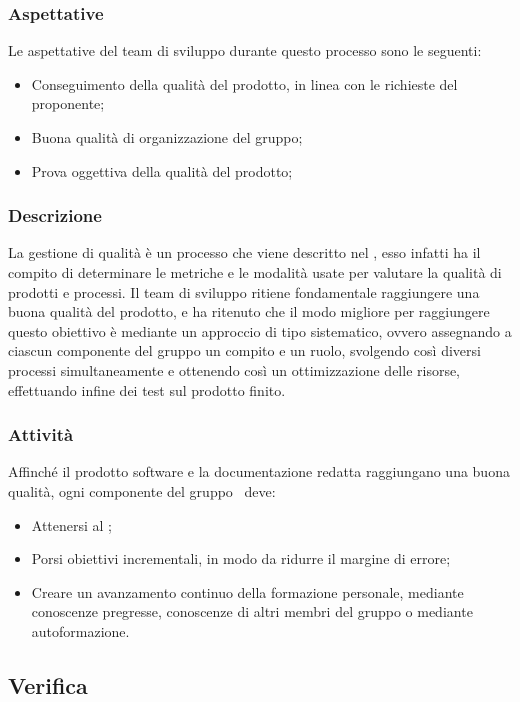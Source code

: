 \subsubsection{Aspettative}
Le aspettative del team di sviluppo durante questo processo sono le seguenti:
\begin {itemize}
    \item Conseguimento della qualità del prodotto, in linea con le richieste del proponente;
    \item Buona qualità di organizzazione del gruppo;
    \item Prova oggettiva della qualità del prodotto;
\end {itemize}
\subsubsection{Descrizione}
La gestione di qualità è un processo che viene descritto nel \docNamePdQLow, esso infatti ha il compito di determinare le metriche e le modalità usate per valutare la qualità di prodotti e processi.
Il team di sviluppo ritiene fondamentale raggiungere una buona qualità del prodotto, e ha ritenuto che il modo migliore per raggiungere questo obiettivo è mediante un approccio di tipo sistematico, ovvero assegnando a ciascun componente del gruppo un compito e un ruolo, svolgendo così diversi processi simultaneamente e ottenendo così un ottimizzazione delle risorse, effettuando infine dei test sul prodotto finito. 
\subsubsection{Attività}
Affinché il prodotto software e la documentazione redatta raggiungano una buona qualità, ogni componente del gruppo \groupName\ deve:
\begin{itemize}
    \item Attenersi al \docNamePdQLow;
    \item Porsi obiettivi incrementali, in modo da ridurre il margine di errore;
    \item Creare un avanzamento continuo della formazione personale, mediante conoscenze pregresse, conoscenze di altri membri del gruppo o mediante autoformazione. 
 \end {itemize}   


 \vspace{2cm}

\subsection{Verifica} \label{subsection: Verifica}
